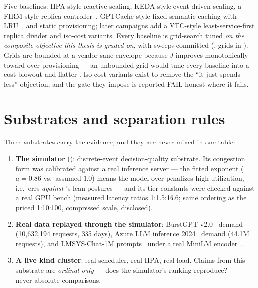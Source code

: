 Five baselines: HPA-style reactive scaling, KEDA-style event-driven scaling,
a FIRM-style replica controller~\citep{firm2020}, GPTCache-style fixed
semantic caching with LRU~\citep{gptcache2023}, and static provisioning;
later campaigns add a VTC-style least-service-first replica divider
\citep{vtc2024} and iso-cost variants. Every baseline is grid-search tuned
\emph{on the composite objective this thesis is graded on}, with sweeps
committed (, grids in
). Grids are bounded at a vendor-sane envelope
because $J$ improves monotonically toward over-provisioning --- an unbounded
grid would tune every baseline into a cost blowout and flatter \polyforge{}.
Iso-cost variants exist to remove the ``it just spends less'' objection, and
the gate they impose is reported FAIL-honest where it fails.

\section{Substrates and separation rules}
\label{sec:method-substrates}

Three substrates carry the evidence, and they are never mixed in one table:

\begin{enumerate}
  \item \textbf{The simulator} (): discrete-event
        decision-quality substrate. Its congestion form was calibrated
        against a real inference server --- the fitted exponent
        ($a{=}0.86$ vs.\ assumed $1.0$) means the model over-penalizes high
        utilization, i.e.\ errs \emph{against} \polyforge{}'s lean postures
        --- and its tier constants were checked against a real GPU bench
        (measured latency ratios 1:1.5:16.6; same ordering as the priced
        1:10:100, compressed scale, disclosed).
  \item \textbf{Real data replayed through the simulator}: BurstGPT
        v2.0~\citep{burstgpt2024} demand (10{,}632{,}194 requests, 335
        days), Azure LLM inference 2024~\citep{azurellmtrace2024} demand
        (44.1M requests), and LMSYS-Chat-1M prompts~\citep{lmsyschat1m2024}
        under a real MiniLM encoder~\citep{minilm2020,sbert2019}.
  \item \textbf{A live kind cluster}: real scheduler, real HPA, real load.
        Claims from this substrate are \emph{ordinal only} --- does the
        simulator's ranking reproduce? --- never absolute comparisons.
\end{enumerate}

